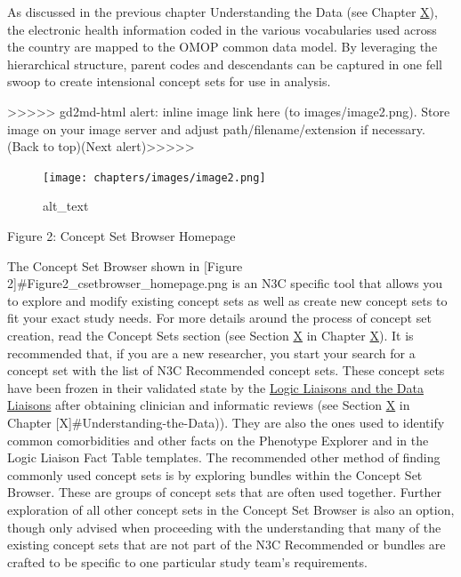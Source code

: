 \documentclass[
  letterpaper,
  DIV=11,
  numbers=noendperiod]{scrreprt}
\begin{document}
As discussed in the previous chapter Understanding the Data (see Chapter
\protect\hyperlink{Understanding-the-Data}{X}), the electronic health
information coded in the various vocabularies used across the country
are mapped to the OMOP common data model. By leveraging the hierarchical
structure, parent codes and descendants can be captured in one fell
swoop to create intensional concept sets for use in analysis.

{\textgreater\textgreater\textgreater\textgreater\textgreater{}
gd2md-html alert: inline image link here (to images/image2.png). Store
image on your image server and adjust path/filename/extension if
necessary. }(Back to top)(Next
alert){\textgreater\textgreater\textgreater\textgreater\textgreater{} }

\begin{figure}

{\centering \texttt{[image: chapters/images/image2.png]}

}

\caption{alt\_text}

\end{figure}

Figure 2: Concept Set Browser Homepage

The Concept Set Browser shown in {[}Figure
2{]}\#Figure2\_csetbrowser\_homepage.png is an N3C specific tool that
allows you to explore and modify existing concept sets as well as create
new concept sets to fit your exact study needs. For more details around
the process of concept set creation, read the Concept Sets section (see
Section \protect\hyperlink{Concept-Sets}{X} in Chapter
\protect\hyperlink{Understanding-the-Data}{X}). It is recommended that,
if you are a new researcher, you start your search for a concept set
with the list of N3C Recommended concept sets. These concept sets have
been frozen in their validated state by the
\href{https://covid.cd2h.org/liaisons}{Logic Liaisons and the Data
Liaisons} after obtaining clinician and informatic reviews (see Section
\protect\hyperlink{N3C-Recommended-concept-sets}{X} in Chapter
{[}X{]}\#Understanding-the-Data)). They are also the ones used to
identify common comorbidities and other facts on the Phenotype Explorer
and in the Logic Liaison Fact Table templates. The recommended other
method of finding commonly used concept sets is by exploring bundles
within the Concept Set Browser. These are groups of concept sets that
are often used together. Further exploration of all other concept sets
in the Concept Set Browser is also an option, though only advised when
proceeding with the understanding that many of the existing concept sets
that are not part of the N3C Recommended or bundles are crafted to be
specific to one particular study team's requirements.
\end{document}
